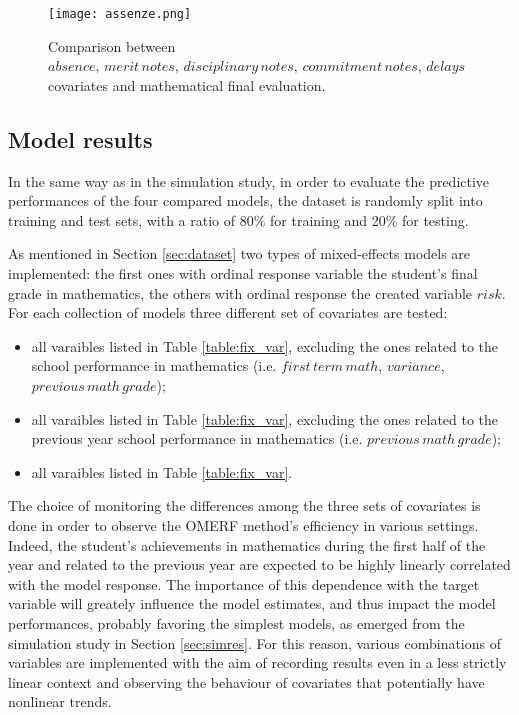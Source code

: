 \begin{figure}[H]
    \centering
    \texttt{[image: assenze.png]}
    \caption{Comparison between \(absence, \, merit\,notes, \, disciplinary\,notes, \, commitment\,notes, \, delays\) covariates and mathematical final evaluation.}
    \label{fig:ass}
\end{figure}







\subsection{Model results}
\label{sec:modres}
In the same way as in the simulation study, in order to evaluate the predictive performances of the four compared models, the dataset is randomly split into training and test sets, with a ratio of 80\% for training and 20\% for testing.

As mentioned in Section \ref{sec:dataset} two types of mixed-effects models are implemented: the first ones with ordinal response variable the student's final grade in mathematics, the others with ordinal response the created variable \(risk\).
For each collection of models three different set of covariates are tested:
\begin{itemize}
    \item all varaibles listed in Table \ref{table:fix_var}, excluding the ones related to the school performance in mathematics (i.e. \(first \, term \, math\), \(variance\), \(previous \, math \, grade\));
    \item all varaibles listed in Table \ref{table:fix_var}, excluding the ones related to the previous year school performance in mathematics (i.e. \(previous \, math \, grade\));
    \item all varaibles listed in Table \ref{table:fix_var}.
\end{itemize}
The choice of monitoring the differences among the three sets of covariates is done in order to observe the OMERF method's efficiency in various settings.
Indeed, the student's achievements in mathematics during the first half of the year and related to the previous year are expected to be highly linearly correlated with the model response.
The importance of this dependence with the target variable will greately influence the model estimates, and thus impact the model performances, probably favoring the simplest models, as emerged from the simulation study in Section \ref{sec:simres}.
For this reason, various combinations of variables are implemented with the aim of recording results even in a less strictly linear context and observing the behaviour of covariates that potentially have nonlinear trends.

